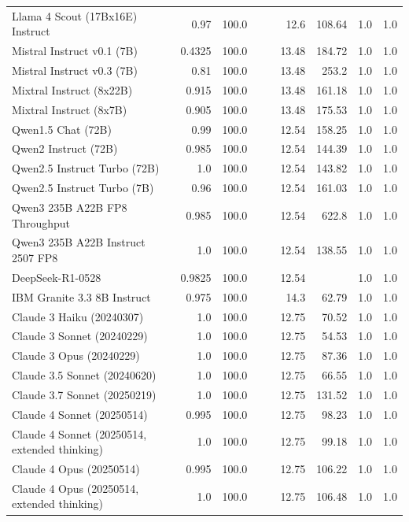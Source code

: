 \begin{table}[htp]
{\begin{tabular}{lrrrrrrrr}
Llama 4 Scout (17Bx16E) Instruct & 0.97 & 100.0 &  &  & 12.6 & 108.64 & 1.0 & 1.0 \\
Mistral Instruct v0.1 (7B) & 0.4325 & 100.0 &  &  & 13.48 & 184.72 & 1.0 & 1.0 \\
Mistral Instruct v0.3 (7B) & 0.81 & 100.0 &  &  & 13.48 & 253.2 & 1.0 & 1.0 \\
Mixtral Instruct (8x22B) & 0.915 & 100.0 &  &  & 13.48 & 161.18 & 1.0 & 1.0 \\
Mixtral Instruct (8x7B) & 0.905 & 100.0 &  &  & 13.48 & 175.53 & 1.0 & 1.0 \\
Qwen1.5 Chat (72B) & 0.99 & 100.0 &  &  & 12.54 & 158.25 & 1.0 & 1.0 \\
Qwen2 Instruct (72B) & 0.985 & 100.0 &  &  & 12.54 & 144.39 & 1.0 & 1.0 \\
Qwen2.5 Instruct Turbo (72B) & 1.0 & 100.0 &  &  & 12.54 & 143.82 & 1.0 & 1.0 \\
Qwen2.5 Instruct Turbo (7B) & 0.96 & 100.0 &  &  & 12.54 & 161.03 & 1.0 & 1.0 \\
Qwen3 235B A22B FP8 Throughput & 0.985 & 100.0 &  &  & 12.54 & 622.8 & 1.0 & 1.0 \\
Qwen3 235B A22B Instruct 2507 FP8 & 1.0 & 100.0 &  &  & 12.54 & 138.55 & 1.0 & 1.0 \\
DeepSeek-R1-0528 & 0.9825 & 100.0 &  &  & 12.54 &  & 1.0 & 1.0 \\
IBM Granite 3.3 8B Instruct & 0.975 & 100.0 &  &  & 14.3 & 62.79 & 1.0 & 1.0 \\
Claude 3 Haiku (20240307) & 1.0 & 100.0 &  &  & 12.75 & 70.52 & 1.0 & 1.0 \\
Claude 3 Sonnet (20240229) & 1.0 & 100.0 &  &  & 12.75 & 54.53 & 1.0 & 1.0 \\
Claude 3 Opus (20240229) & 1.0 & 100.0 &  &  & 12.75 & 87.36 & 1.0 & 1.0 \\
Claude 3.5 Sonnet (20240620) & 1.0 & 100.0 &  &  & 12.75 & 66.55 & 1.0 & 1.0 \\
Claude 3.7 Sonnet (20250219) & 1.0 & 100.0 &  &  & 12.75 & 131.52 & 1.0 & 1.0 \\
Claude 4 Sonnet (20250514) & 0.995 & 100.0 &  &  & 12.75 & 98.23 & 1.0 & 1.0 \\
Claude 4 Sonnet (20250514, extended thinking) & 1.0 & 100.0 &  &  & 12.75 & 99.18 & 1.0 & 1.0 \\
Claude 4 Opus (20250514) & 0.995 & 100.0 &  &  & 12.75 & 106.22 & 1.0 & 1.0 \\
Claude 4 Opus (20250514, extended thinking) & 1.0 & 100.0 &  &  & 12.75 & 106.48 & 1.0 & 1.0 \\

\end{tabular}}
\end{table}
